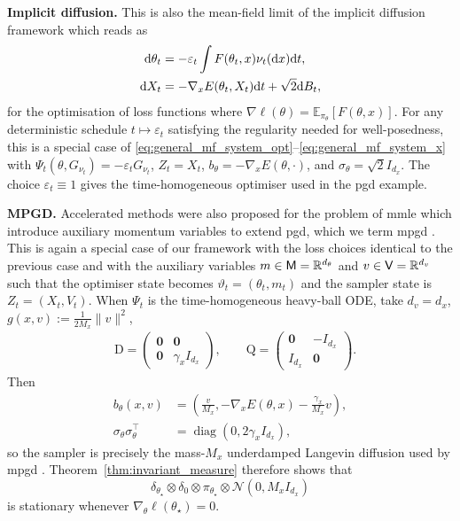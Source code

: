 \textbf{Implicit diffusion.} This is also the mean-field limit of the implicit diffusion framework \citep[Section~4.1]{marion2025implicitdiffusionefficientoptimization} which reads as
\begin{align*}
\mathrm{d} \theta_t &= - \varepsilon_t \int F(\theta_t, x) \nu_t(\mathrm{d} x) \mathrm{d} t,\\
\mathrm{d} X_t &= - \nabla_x E(\theta_t, X_t) \mathrm{d} t + \sqrt{2} \mathrm{d} B_t,
\end{align*}
for the optimisation of loss functions where $\nabla \ell(\theta) = \mathbb{E}_{\pi_\theta}[F(\theta, x)]$. For any deterministic schedule \(t\mapsto\varepsilon_t\) satisfying the regularity needed for well-posedness, this is a special case of \eqref{eq:general_mf_system_opt}--\eqref{eq:general_mf_system_x} with \(\Psi_t(\theta,G_{\nu_t})=-\varepsilon_t G_{\nu_t}\), \(Z_t=X_t\), \(b_\theta=-\nabla_xE(\theta,\cdot)\), and \(\sigma_\theta=\sqrt2I_{d_x}\). The choice \(\varepsilon_t\equiv1\) gives the time-homogeneous optimiser used in the \gls*{pgd} example.

\textbf{MPGD.} Accelerated methods were also proposed for the problem of \gls*{mmle} which introduce auxiliary momentum variables to extend \gls*{pgd}, which we term \gls*{mpgd} \citep{lim2024momentumparticlemaximumlikelihood}. This is again a special case of our framework with the loss choices identical to the previous case and with the auxiliary variables $m\in {\mathsf{M}}=\mathbb{R}^{d_\theta}$ and $v\in {\mathsf{V}}=\mathbb{R}^{d_v}$ such that the optimiser state becomes $\vartheta_t=(\theta_t,m_t)$ and the sampler state is $Z_t=(X_t,V_t)$. When \(\Psi_t\) is the time-homogeneous heavy-ball ODE, take \(d_v=d_x\), $g(x,v):=\tfrac{1}{2M_x}\|v\|^2$,
\[
\begin{aligned}
&\mathrm D=
\begin{pmatrix}
\mathbf 0&\mathbf 0\\
\mathbf 0&\gamma_xI_{d_x}
\end{pmatrix},
\qquad
\mathrm Q=
\begin{pmatrix}
\mathbf 0&-I_{d_x}\\
I_{d_x}&\mathbf 0
\end{pmatrix}.
\end{aligned}
\]
Then
\[
\begin{aligned}
b_\theta(x,v)
&=
\left(
\tfrac{v}{M_x},
-\nabla_xE(\theta,x)-\tfrac{\gamma_x}{M_x}v
\right),\\
\sigma_\theta\sigma_\theta^\top
&=
\operatorname{diag}(0,2\gamma_xI_{d_x}),
\end{aligned}
\]
so the sampler is precisely the mass-\(M_x\) underdamped Langevin diffusion used by \gls*{mpgd} \citep{lim2024momentumparticlemaximumlikelihood}. Theorem~\ref{thm:invariant_measure} therefore shows that
\[
\delta_{\theta_\star}\otimes\delta_0\otimes\pi_{\theta_\star}
\otimes\mathcal N(0,M_xI_{d_x})
\]
is stationary whenever \(\nabla_\theta\ell(\theta_\star)=0\).


